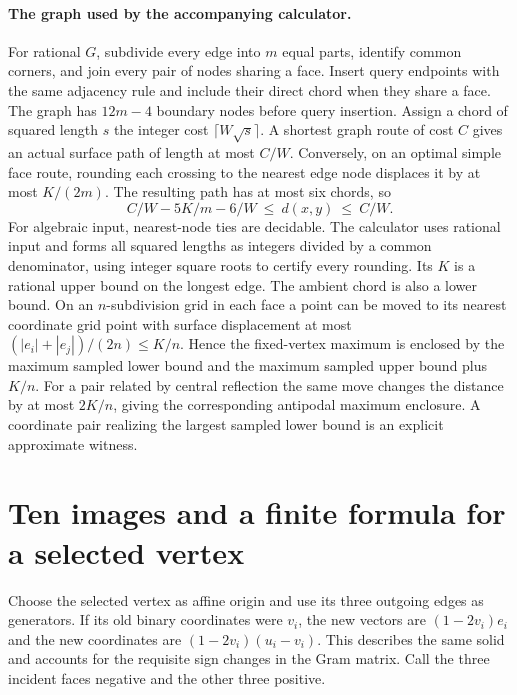\documentclass[10pt,letterpaper]{article}
\begin{document}
\paragraph{The graph used by the accompanying calculator.}
For rational $G$, subdivide every edge into $m$ equal parts, identify
common corners, and join every pair of nodes sharing a face. Insert
query endpoints with the same adjacency rule and include their direct
chord when they share a face. The graph has $12m-4$ boundary nodes
before query insertion. Assign a chord of squared length $s$ the
integer cost $\lceil W\sqrt{s}\rceil$. A shortest graph route of cost
$C$ gives an actual surface path of length at most $C/W$. Conversely,
on an optimal simple face route, rounding each crossing to the nearest
edge node displaces it by at most $K/(2m)$. The resulting path has at
most six chords, so
\[
       C/W-5K/m-6/W\ \le\ d(x,y)\ \le\ C/W .
\]
For algebraic input, nearest-node ties are decidable. The calculator
uses rational input and forms all squared lengths as integers divided
by a common denominator, using integer square roots to certify every
rounding. Its $K$ is a rational upper bound on the longest edge.
The ambient chord is also a lower bound. On an $n$-subdivision grid
in each face a point can be moved to its nearest coordinate grid point
with surface displacement at most $(|e_i|+|e_j|)/(2n)\le K/n$.
Hence the fixed-vertex maximum is enclosed by the maximum sampled
lower bound and the maximum sampled upper bound plus $K/n$.
For a pair related by central reflection the same move changes the
distance by at most $2K/n$, giving the corresponding antipodal
maximum enclosure. A coordinate pair realizing the largest sampled
lower bound is an explicit approximate witness.

\section{Ten images and a finite formula for a selected vertex}
\label{sec:fixed-images}

Choose the selected vertex as affine origin and use its three outgoing
edges as generators. If its old binary coordinates were $v_i$, the new
vectors are $(1-2v_i)e_i$ and the new coordinates are
$(1-2v_i)(u_i-v_i)$. This describes the same solid and accounts for
the requisite sign changes in the Gram matrix. Call the three incident
faces negative and the other three positive.
\end{document}

